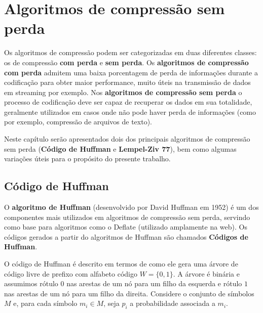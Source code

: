 \chapter{Algoritmos de compressão sem perda}\label{cap:comp}

Os algoritmos de compressão podem ser categorizadas em duas diferentes classes: os de compressão \textbf{com perda} e \textbf{sem perda}. 
Os \textbf{algoritmos de compressão com perda} admitem uma baixa porcentagem de perda de informações durante a codificação para obter maior performance, muito úteis na transmissão de dados em streaming por exemplo. 
Nos \textbf{algoritmos de compressão sem perda} o processo de codificação deve ser capaz de recuperar os dados em sua totalidade, geralmente utilizados em casos onde não pode haver perda de informações (como por exemplo, compressão de arquivos de texto).

Neste capítulo serão apresentados dois dos principais algoritmos de compressão sem perda (\textbf{Código de Huffman} e \textbf{Lempel-Ziv 77}), bem como algumas variações úteis para o propósito do presente trabalho.

\pagebreak

\section{Código de Huffman} \label{sec:huff}
O \textbf{algoritmo de Huffman} (desenvolvido por David Huffman em 1952) é um dos componentes mais utilizados em algoritmos de compressão sem perda, servindo como base para algoritmos como o Deflate (utilizado amplamente na web).
Os códigos gerados a partir do algoritmos de Huffman são chamados \textbf{Códigos de Huffman}.

O código de Huffman é descrito em termos de como ele gera uma árvore
de código livre de prefixo com alfabeto código $W = \{0,1\}$. A árvore
é binária e assumimos rótulo $0$ nas arestas de um nó para um filho da
esquerda e rótulo $1$ nas arestas de um nó para um filho da direita.
Considere o conjunto de símbolos $M$ e, para cada símbolo $m_i\in M$,
seja $p_i$ a probabilidade associada a $m_i$.

